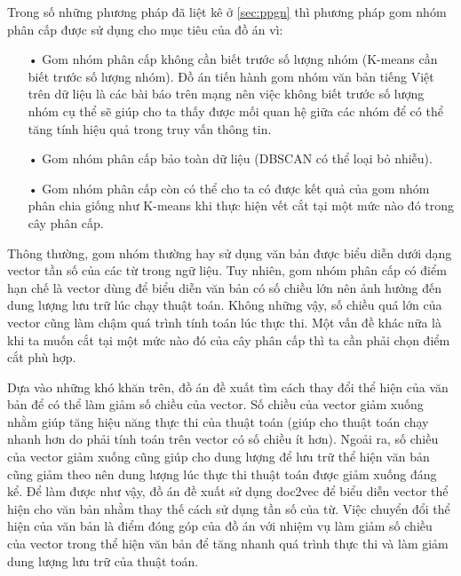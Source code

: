 Trong số những phương pháp đã liệt kê ở \ref{sec:ppgn} thì phương pháp gom nhóm phân cấp được sử dụng cho mục tiêu của đồ án vì:
\begin{enumerate}
\item[•]Gom nhóm phân cấp không cần biết trước số lượng nhóm (K-means cần biết trước số lượng nhóm).
Đồ án tiến hành gom nhóm văn bản tiếng Việt trên dữ liệu là các bài báo trên mạng nên việc không biết trước số lượng nhóm cụ thể sẽ giúp cho ta thấy được mối quan hệ giữa các nhóm để có thể tăng tính hiệu quả trong truy vấn thông tin.
\item[•]Gom nhóm phân cấp bảo toàn dữ liệu (DBSCAN có thể loại bỏ nhiễu).
\item[•]Gom nhóm phân cấp còn có thể cho ta có được kết quả của gom nhóm phân chia giống như K-means khi thực hiện vết cắt tại một mức nào đó trong cây phân cấp.
\end{enumerate}

Thông thường, gom nhóm thường hay sử dụng văn bản được biểu diễn dưới dạng vector tần số của các từ trong ngữ liệu.
Tuy nhiên, gom nhóm phân cấp có điểm hạn chế là vector dùng để biểu diễn văn bản có số chiều lớn nên ảnh hưởng đến dung lượng lưu trữ lúc chạy thuật toán.
Không những vậy, số chiều quá lớn của vector cũng làm chậm quá trình tính toán lúc thực thi.
Một vấn đề khác nữa là khi ta muốn cắt tại một mức nào đó của cây phân cấp thì ta cần phải chọn điểm cắt phù hợp.

Dựa vào những khó khăn trên, đồ án đề xuất tìm cách thay đổi thể hiện của văn bản để có thể làm giảm số chiều của vector.
Số chiều của vector giảm xuống nhằm giúp tăng hiệu năng thực thi của thuật toán (giúp cho thuật toán chạy nhanh hơn do phải tính toán trên vector có số chiều ít hơn).
Ngoải ra, số chiều của vector giảm xuống cũng giúp cho dung lượng để lưu trữ thể hiện văn bản cũng giảm theo nên dung lượng lúc thực thi thuật toán được giảm xuống đáng kể.
Để làm được như vậy, đồ án đề xuất sử dụng doc2vec để biểu diễn vector thể hiện cho văn bản nhằm thay thế cách sử dụng tần số của từ.
Việc chuyển đổi thể hiện của văn bản là điểm đóng góp của đồ án với nhiệm vụ làm giảm số chiều của vector trong thể hiện văn bản để tăng nhanh quá trình thực thi và làm giảm dung lượng lưu trữ của thuật toán.

